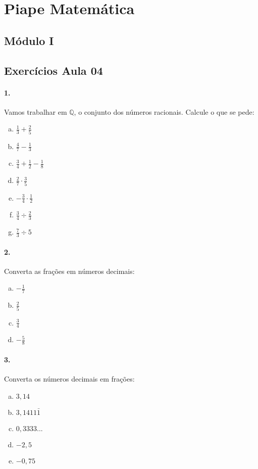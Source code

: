 \documentclass[a4paper,twocolumn,12pt]{article}
\begin{document}
 
\section*{Piape Matemática} 

\subsection*{Módulo I}
\subsection*{Exercícios Aula 04}

\paragraph*{1. } Vamos trabalhar em $\mathbb{Q}$, o conjunto dos números racionais. Calcule o que se pede:

\begin{enumerate}[a)]
\item $\frac{1}{3} + \frac{2}{5}$
\item $\frac{4}{7} - \frac{1}{3}$
\item $\frac{3}{4} + \frac{1}{2} - \frac{1}{8}$
\item $\frac{2}{7}\cdot \frac{3}{5}$
\item $-\frac{3}{4} \cdot \frac{1}{2}$
\item $\frac{3}{4} \div \frac{2}{3}$
\item $ \frac{7}{3} \div 5$
\end{enumerate}


\paragraph*{2. } Converta as frações em números decimais:
\begin{enumerate}[a)]
\item $-\frac{1}{7}$
\item $\frac{2}{5}$
\item $\frac{3}{4}$
\item $-\frac{5}{8}$
\end{enumerate}

\paragraph*{3. } Converta os números decimais em frações:
\begin{enumerate}[a)]
\item $3,\!14$
\item $3,\!1411\bar{1}$
\item $0,\!3333...$
\item $-2,\!5$
\item $-0,\!75$
\end{enumerate}
\end{document}
